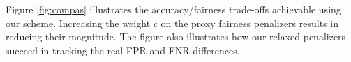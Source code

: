 Figure \ref{fig:compas} illustrates the accuracy/fairness trade-offs achievable using our scheme. Increasing the weight $c$ on the proxy fairness penalizers results in reducing their magnitude. The figure also illustrates how our relaxed penalizers succeed in tracking the real FPR and FNR differences. 
%
%







